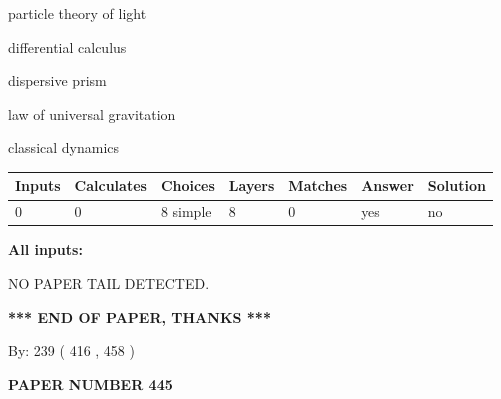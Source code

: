 \documentclass[12pt]{article}
\begin{document}
 
\noindent{}
 
 
particle theory of light
 
 
differential calculus
 
 
dispersive prism
 
 
law of universal gravitation
 
 
classical dynamics
 
 
\noindent{}
 
 
   
   
   
   
\noindent\begin{tabular}{|l|l|l|l|l|l|l|}
 \hline
Inputs & Calculates & Choices & Layers & Matches & Answer & Solution \\ \hline
 0  & 
 0  & 
 8
  simple  
  & 
 8  & 
 0  & 
  yes & 
  no 
  \\ \hline
 \end{tabular}
   
   
   
   
\noindent{}
   
   
   
   
\noindent\vspace{0.1in}\hspace{-0.08in} {\textbf{\Large{All inputs: }}}
   
   
   
   
\vspace{2.0in} NO PAPER TAIL DETECTED.
   
   
   
   
\vspace{1.0in} 
{\textbf{\large{ *** END OF PAPER, THANKS *** }}} 
   
   
\hspace{1.0in} By: 
 239 ( 416 ,  458 )
   
   
   
   
\newpage 
\setcounter{page}{ 
   445001 } 
   
   
   
   
 {\textbf{ \Large{ PAPER NUMBER  445  }}}
   
\end{document}
